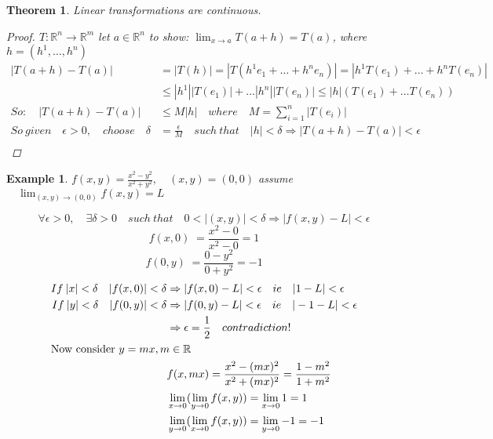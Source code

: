 \documentclass[12pt]{article}
\def\RR{\mathbb{R}}
\newtheorem{theorem}{Theorem}[section]
\newtheorem{example}{Example}[section]
\begin{document}
\begin{theorem}\label{T:Lin trans cont}
Linear transformations are continuous.
\begin{proof}
$T:\RR^{n} \rightarrow \RR^{m}$ let $a \in \RR^{n}$ to show: $\lim_{x\to a}T(a+h) = T(a)$, where $h = (h^1 , \dots , h^n )$
\begin{align*}
|T(a+h) - T(a)| & = |T(h)|=|T(h^{1}e_{1}+ \dots +h^{n}e_{n})| =|h^{1}T(e_{1}) + \dots +h^{n}T(e_{n})|\\ 
&\leq  |h^{1}||T(e_{1})|+ \dots |h^{n}||T(e_{n})| \leq |h|(T(e_{1})+ \dots T(e_{n})) \\
So: \quad |T(a+h) - T(a)| &\leq  M|h| \quad where \quad M= \sum_{i=1}^{n}|T(e_i)| \\
So \: given \quad \epsilon > 0,\quad choose \quad \delta &= \frac{\epsilon}{M} \quad such \: that \quad |h|< \delta \Rightarrow |T(a+h) - T(a)|< \epsilon \\
\end{align*}
\end{proof}
\end{theorem}

\begin{example}
$f(x,y)= \frac{x^{2} - y^{2}}{x^{2} +y^{2}}, \quad (x,y)=(0,0)$ assume $\quad \lim_{(x,y) \to (0,0)} f(x,y) = L$

\[\forall \epsilon > 0, \quad  \exists \delta >0  \quad such\: that \quad 0<|(x,y)|<\delta \Rightarrow |f(x,y)-L|<\epsilon \]
\[f(x,0) \;= \frac{x^{2}-0}{x^{2}-0} = 1\]
\[ f(0,y)\;= \frac{0-y^{2}}{0 +y^{2}} = -1\]
\begin{align*}
If \: |x|< \delta \quad |f(x,0)| < \delta & \Rightarrow |f(x,0) - L|< \epsilon \quad ie \quad |1-L|< \epsilon\\
If \: |y|< \delta \quad |f(0,y)| < \delta& \Rightarrow |f(0,y) - L|< \epsilon \quad ie \quad |-1-L|< \epsilon\\
&\Rightarrow \epsilon = \frac{1}{2} \quad contradiction! \\
\shortintertext{Now consider $ y=mx, m \in \RR$}
&f(x,mx)=\frac{x^{2} - (mx)^{2}}{x^{2} + (mx)^{2}} = \frac{1-m^{2}}{1+m^{2}}\\
&\lim_{x \to 0}(\lim_{y \to 0} f(x,y)) = \lim_{x \to 0}1 = 1\\
&\lim_{y \to 0}(\lim_{x \to 0} f(x,y)) = \lim_{y \to 0}-1 = -1\\
\end{align*}
\\

\end{example}
\end{document}
